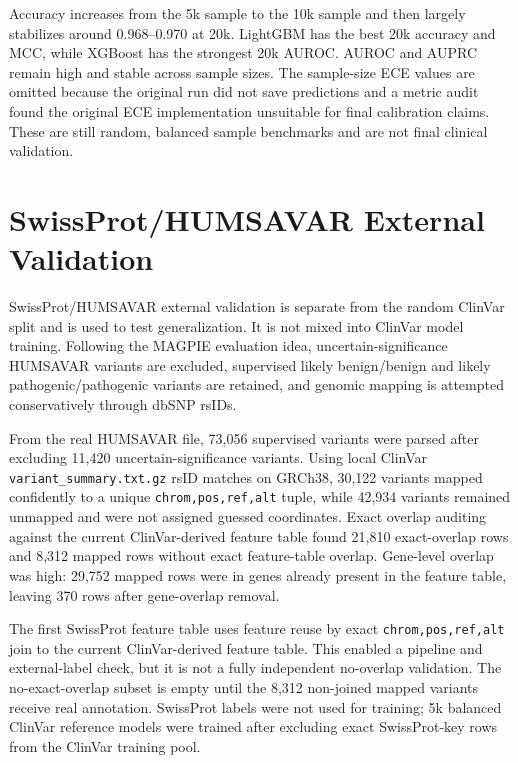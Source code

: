 \documentclass[conference]{IEEEtran}
\begin{document}
Accuracy increases from the 5k sample to the 10k sample and then largely stabilizes around 0.968--0.970 at 20k. LightGBM has the best 20k accuracy and MCC, while XGBoost has the strongest 20k AUROC. AUROC and AUPRC remain high and stable across sample sizes. The sample-size ECE values are omitted because the original run did not save predictions and a metric audit found the original ECE implementation unsuitable for final calibration claims. These are still random, balanced sample benchmarks and are not final clinical validation.

\section{SwissProt/HUMSAVAR External Validation}
SwissProt/HUMSAVAR external validation is separate from the random ClinVar split and is used to test generalization. It is not mixed into ClinVar model training. Following the MAGPIE evaluation idea, uncertain-significance HUMSAVAR variants are excluded, supervised likely benign/benign and likely pathogenic/pathogenic variants are retained, and genomic mapping is attempted conservatively through dbSNP rsIDs.

From the real HUMSAVAR file, 73,056 supervised variants were parsed after excluding 11,420 uncertain-significance variants. Using local ClinVar \texttt{variant\_summary.txt.gz} rsID matches on GRCh38, 30,122 variants mapped confidently to a unique \texttt{chrom,pos,ref,alt} tuple, while 42,934 variants remained unmapped and were not assigned guessed coordinates. Exact overlap auditing against the current ClinVar-derived feature table found 21,810 exact-overlap rows and 8,312 mapped rows without exact feature-table overlap. Gene-level overlap was high: 29,752 mapped rows were in genes already present in the feature table, leaving 370 rows after gene-overlap removal.

The first SwissProt feature table uses feature reuse by exact \texttt{chrom,pos,ref,alt} join to the current ClinVar-derived feature table. This enabled a pipeline and external-label check, but it is not a fully independent no-overlap validation. The no-exact-overlap subset is empty until the 8,312 non-joined mapped variants receive real annotation. SwissProt labels were not used for training; 5k balanced ClinVar reference models were trained after excluding exact SwissProt-key rows from the ClinVar training pool.
\end{document}
